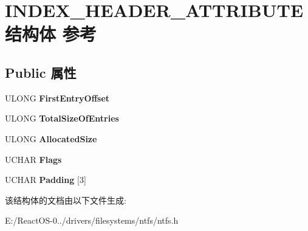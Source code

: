 \hypertarget{struct_i_n_d_e_x___h_e_a_d_e_r___a_t_t_r_i_b_u_t_e}{}\section{I\+N\+D\+E\+X\+\_\+\+H\+E\+A\+D\+E\+R\+\_\+\+A\+T\+T\+R\+I\+B\+U\+T\+E结构体 参考}
\label{struct_i_n_d_e_x___h_e_a_d_e_r___a_t_t_r_i_b_u_t_e}
\subsection*{Public 属性}
\begin{DoxyCompactItemize}
\item 
\mbox{\label{struct_i_n_d_e_x___h_e_a_d_e_r___a_t_t_r_i_b_u_t_e_a689643718e7471502fb9a54097774c26}} 
U\+L\+O\+NG {\bfseries First\+Entry\+Offset}
\item 
\mbox{\label{struct_i_n_d_e_x___h_e_a_d_e_r___a_t_t_r_i_b_u_t_e_a7341da933fc8f88199d6a473a6f5ec49}} 
U\+L\+O\+NG {\bfseries Total\+Size\+Of\+Entries}
\item 
\mbox{\label{struct_i_n_d_e_x___h_e_a_d_e_r___a_t_t_r_i_b_u_t_e_a7cbe552c3cd32ea58119a6f2563326f5}} 
U\+L\+O\+NG {\bfseries Allocated\+Size}
\item 
\mbox{\label{struct_i_n_d_e_x___h_e_a_d_e_r___a_t_t_r_i_b_u_t_e_a719e9311981757b228cb789897693a76}} 
U\+C\+H\+AR {\bfseries Flags}
\item 
\mbox{\label{struct_i_n_d_e_x___h_e_a_d_e_r___a_t_t_r_i_b_u_t_e_ad32db7d9751d9e1de399c89e293e1236}} 
U\+C\+H\+AR {\bfseries Padding} \mbox{[}3\mbox{]}
\end{DoxyCompactItemize}


该结构体的文档由以下文件生成\+:\begin{DoxyCompactItemize}
\item 
E\+:/\+React\+O\+S-\/0../drivers/filesystems/ntfs/ntfs.\+h\end{DoxyCompactItemize}
